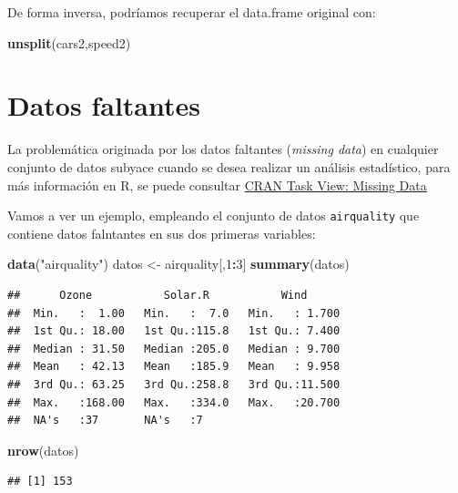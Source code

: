 \documentclass[
]{book}
\newenvironment{Shaded}{\begin{snugshade}}{\end{snugshade}}
\newcommand{\DecValTok}[1]{\textcolor[rgb]{0.00,0.00,0.81}{#1}}
\newcommand{\FunctionTok}[1]{\textcolor[rgb]{0.13,0.29,0.53}{\textbf{#1}}}
\newcommand{\NormalTok}[1]{#1}
\newcommand{\OtherTok}[1]{\textcolor[rgb]{0.56,0.35,0.01}{#1}}
\newcommand{\SpecialCharTok}[1]{\textcolor[rgb]{0.81,0.36,0.00}{\textbf{#1}}}
\newcommand{\StringTok}[1]{\textcolor[rgb]{0.31,0.60,0.02}{#1}}
\begin{document}
De forma inversa, podríamos recuperar el data.frame original con:

\begin{Shaded}
\begin{Highlighting}[]
\FunctionTok{unsplit}\NormalTok{(cars2,speed2)}
\end{Highlighting}
\end{Shaded}

\section{Datos faltantes}\label{missing}

La problemática originada por los datos faltantes (\emph{missing data}) en cualquier conjunto de datos subyace cuando se desea
realizar un análisis estadístico, para más información en R, se puede consultar \href{https://cran.r-project.org/web/views/MissingData.html}{CRAN Task View: Missing Data}

Vamos a ver un ejemplo, empleando el conjunto de datos \texttt{airquality} que contiene datos falntantes en sus dos primeras variables:

\begin{Shaded}
\begin{Highlighting}[]
\FunctionTok{data}\NormalTok{(}\StringTok{"airquality"}\NormalTok{)}
\NormalTok{datos }\OtherTok{\textless{}{-}}\NormalTok{ airquality[,}\DecValTok{1}\SpecialCharTok{:}\DecValTok{3}\NormalTok{]}
\FunctionTok{summary}\NormalTok{(datos)}
\end{Highlighting}
\end{Shaded}

\begin{verbatim}
##      Ozone           Solar.R           Wind       
##  Min.   :  1.00   Min.   :  7.0   Min.   : 1.700  
##  1st Qu.: 18.00   1st Qu.:115.8   1st Qu.: 7.400  
##  Median : 31.50   Median :205.0   Median : 9.700  
##  Mean   : 42.13   Mean   :185.9   Mean   : 9.958  
##  3rd Qu.: 63.25   3rd Qu.:258.8   3rd Qu.:11.500  
##  Max.   :168.00   Max.   :334.0   Max.   :20.700  
##  NA's   :37       NA's   :7
\end{verbatim}

\begin{Shaded}
\begin{Highlighting}[]
\FunctionTok{nrow}\NormalTok{(datos)}
\end{Highlighting}
\end{Shaded}

\begin{verbatim}
## [1] 153
\end{verbatim}
\end{document}
